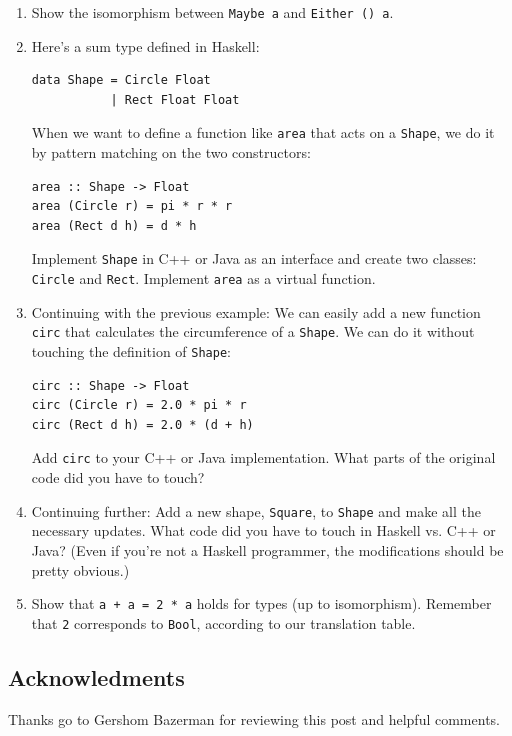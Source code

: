 \begin{enumerate}
\tightlist
\item
  Show the isomorphism between \texttt{Maybe a} and
  \texttt{Either () a}.
\item
  Here's a sum type defined in Haskell:

\begin{verbatim}
data Shape = Circle Float 
           | Rect Float Float
\end{verbatim}

  When we want to define a function like \texttt{area} that acts on a
  \texttt{Shape}, we do it by pattern matching on the two constructors:

\begin{verbatim}
area :: Shape -> Float
area (Circle r) = pi * r * r
area (Rect d h) = d * h
\end{verbatim}

  Implement \texttt{Shape} in C++ or Java as an interface and create two
  classes: \texttt{Circle} and \texttt{Rect}. Implement \texttt{area} as
  a virtual function.
\item
  Continuing with the previous example: We can easily add a new function
  \texttt{circ} that calculates the circumference of a \texttt{Shape}.
  We can do it without touching the definition of \texttt{Shape}:

\begin{verbatim}
circ :: Shape -> Float
circ (Circle r) = 2.0 * pi * r
circ (Rect d h) = 2.0 * (d + h)
\end{verbatim}

  Add \texttt{circ} to your C++ or Java implementation. What parts of
  the original code did you have to touch?
\item
  Continuing further: Add a new shape, \texttt{Square}, to
  \texttt{Shape} and make all the necessary updates. What code did you
  have to touch in Haskell vs. C++ or Java? (Even if you're not a
  Haskell programmer, the modifications should be pretty obvious.)
\item
  Show that \texttt{a\ +\ a\ =\ 2\ *\ a} holds for types (up to
  isomorphism). Remember that \texttt{2} corresponds to \texttt{Bool},
  according to our translation table.
\end{enumerate}

\subsection{Acknowledments}\label{acknowledments}

Thanks go to Gershom Bazerman for reviewing this post and helpful
comments.
